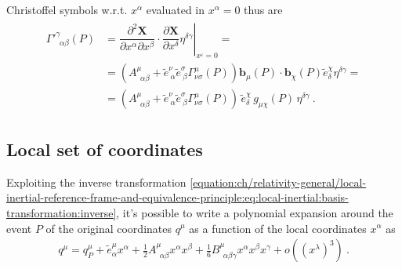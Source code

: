 \documentclass[letterpaper,10pt,english]{jupyterBook}
\begin{document}
\sphinxAtStartPar
Christoffel symbols w.r.t. \(x^\alpha\) evaluated in \(x^\alpha = 0\) thus are
\begin{equation}\label{equation:ch/relativity-general/local-inertial-reference-frame-and-equivalence-principle:eq-gamma-transf-P}
\begin{split}\begin{aligned}
  {\Gamma'}^{\gamma}_{\ \ \alpha \beta}(P)
  & = \left. \dfrac{\partial^2 \mathbf{X}}{\partial x^\alpha \partial x^\beta} \cdot \dfrac{\partial \mathbf{X}}{\partial x^\delta} \eta^{\delta \gamma} \right|_{x^{\varepsilon} = 0} = \\
  & = \left( A^{\mu}_{\ \ \alpha \beta} + \widetilde{e}^{\nu}_{\ \alpha} \widetilde{e}^{\sigma}_{\ \beta} \Gamma^{\mu}_{\nu \sigma}(P) \right) \mathbf{b}_{\mu}(P) \cdot \mathbf{b}_{\chi}(P) \widetilde{e}^{\chi}_{\delta}\eta^{\delta \gamma} = \\
  & = \left( A^{\mu}_{\ \ \alpha \beta} + \widetilde{e}^{\nu}_{\ \alpha} \widetilde{e}^{\sigma}_{\ \beta} \Gamma^{\mu}_{\nu \sigma}(P) \right) \, \widetilde{e}^{\chi}_{\delta}\, g_{\mu \chi}(P) \, \eta^{\delta \gamma} \ .
\end{aligned}\end{split}
\end{equation}

\subsection{Local set of coordinates}
\label{\detokenize{ch/relativity-general/local-inertial-reference-frame-and-equivalence-principle:local-set-of-coordinates}}\label{\detokenize{ch/relativity-general/local-inertial-reference-frame-and-equivalence-principle:general-relativity-local-inertial-reference-frame-local-coordinates}}
\sphinxAtStartPar
Exploiting the inverse transformation \eqref{equation:ch/relativity-general/local-inertial-reference-frame-and-equivalence-principle:eq:local-inertial:basis-transformation:inverse}, it’s possible to write a polynomial expansion around the event \(P\) of the original coordinates \(q^\mu\) as a function of the local coordinates \(x^{\alpha}\) as
\begin{equation}\label{equation:ch/relativity-general/local-inertial-reference-frame-and-equivalence-principle:eq-polynomial-expansion}
\begin{split}q^{\mu} = q^{\mu}_P + \widetilde{e}^{\mu}_{\alpha} x^{\alpha} + \frac{1}{2} A^{\mu}_{\ \ \alpha \beta} x^\alpha x^\beta + \frac{1}{6} B^{\mu}_{\ \ \alpha \beta \gamma} x^{\alpha} x^{\beta} x^\gamma + o\left( \left( x^\lambda \right)^3 \right) \ .\end{split}
\end{equation}
\end{document}

